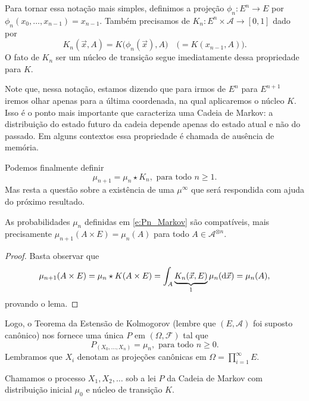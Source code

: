 Para tornar essa notação mais simples, definimos a projeção $\phi_n:E^n \to E$ por $\phi_n(x_0, \dots, x_{n-1}) = x_{n-1}$.
Também precisamos de $K_n: E^n \times \mathcal{A} \to [0,1]$ dado por
\begin{equation}
  K_n(\vec{x},A) = K\big(\phi_n(\vec{x}), A\big) \quad \big(= K(x_{n-1},A) \big).
\end{equation}
O fato de $K_n$ ser um núcleo de transição segue imediatamente dessa propriedade para $K$.

Note que, nessa notação, estamos dizendo que para irmos de $E^n$ para $E^{n+1}$ iremos olhar apenas para a última coordenada, na qual aplicaremos o núcleo $K$.
Isso é o ponto mais importante que caracteriza uma Cadeia de Markov: a distribuição do estado futuro da cadeia depende apenas do estado atual e não do passado.
Em alguns contextos essa propriedade é chamada de ausência de memória.

Podemos finalmente definir
\begin{equation}
  \label{e:Pn_Markov}
  \mu_{n+1} = \mu_n \star K_n, \text{ para todo $n \geq 1$}.
\end{equation}
Mas resta a questão sobre a existência de uma $\mu^\infty$ que será respondida com ajuda do próximo resultado.

\begin{lemma}
  As probabilidades $\mu_n$ definidas em \eqref{e:Pn_Markov} são compatíveis, mais precisamente $\mu_{n+1}(A \times E) = \mu_n(A)$ para todo $A \in \mathcal{A}^{\otimes n}$.
\end{lemma}

\begin{proof}
  Basta observar que
  \begin{equation}
    \mu_{n+1}(A \times E) = \mu_n \star K (A \times E) = \int_{A} \underbrace{K_n (\vec{x}, E)}_1 \mu_n(\mathop{}\!\mathrm{d} \vec{x}) = \mu_n(A),
  \end{equation}
  provando o lema.
\end{proof}

Logo, o Teorema da Estensão de Kolmogorov (lembre que $(E, \mathcal{A})$ foi suposto canônico) nos fornece uma única $P$ em $(\Omega, \mathcal{F})$ tal que
\begin{equation}
   P_{(X_0, \dots, X_n)} = \mu_n, \text{ para todo $n \geq 0$}.
\end{equation}
Lembramos que $X_i$ denotam as projeções canônicas em $\Omega = \prod_{i=1}^\infty E$.

Chamamos o processo $X_1, X_2, \dots$ sob a lei $P$ da Cadeia de Markov  com distribuição inicial $\mu_0$ e núcleo de transição $K$.

